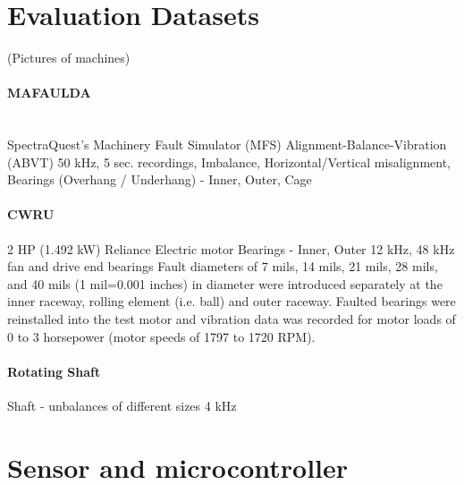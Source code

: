 \section{Evaluation Datasets}
(Pictures of machines)

\paragraph{MAFAULDA}\\
SpectraQuest's Machinery Fault Simulator (MFS) Alignment-Balance-Vibration (ABVT)
50 kHz, 5 sec. recordings, Imbalance, Horizontal/Vertical misalignment, Bearings (Overhang / Underhang) - Inner, Outer, Cage

\paragraph{CWRU}
2 HP (1.492 kW) Reliance Electric motor
Bearings - Inner, Outer
12 kHz, 48 kHz
fan and drive end bearings
Fault diameters of 7 mils, 14 mils, 21 mils, 28 mils, and 40 mils (1 mil=0.001 inches) in diameter were introduced separately at the inner raceway, rolling element (i.e. ball) and outer raceway. 
Faulted bearings were reinstalled into the test motor and vibration data was recorded for motor loads of 0 to 3 horsepower (motor speeds of 1797 to 1720 RPM).

\paragraph{Rotating Shaft}
Shaft -  unbalances of different sizes
4 kHz

\section{Sensor and microcontroller}
